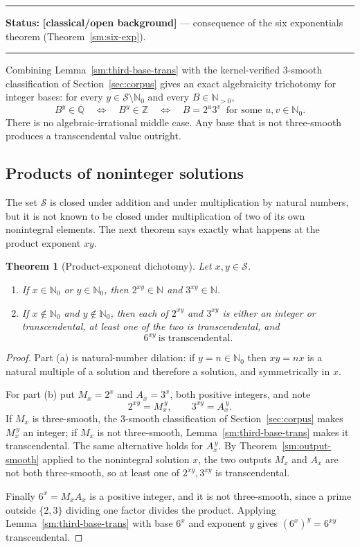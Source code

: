 \documentclass[11pt,oneside]{article}
\newtheorem{theorem}{Theorem}[section]
\theoremstyle{definition}
\theoremstyle{remark}
\newcommand{\N}{\mathbb N}
\newcommand{\Nzero}{\mathbb N_0}
\newcommand{\Z}{\mathbb Z}
\newcommand{\Abar}{\overline{\mathbb Q}}
\newcommand{\Sol}{\mathcal S}
\newcommand{\statusknown}{\textcolor{classicalgray}{\textbf{[classical/open background]}}}
\newenvironment{statusbox}[1]
{\begin{center}\begin{minipage}{0.94\textwidth}\raggedright\hbadness=10000\hrule
\vspace{0.45em}\textbf{Status:} #1\par\vspace{0.35em}}
{\vspace{0.35em}\hrule\end{minipage}\end{center}}
\begin{document}
\begin{statusbox}{\statusknown{} --- consequence of the six exponentials theorem
(Theorem~\ref{sm:six-exp}).}
\end{statusbox}

Combining Lemma~\ref{sm:third-base-trans} with the kernel-verified $3$-smooth classification
of Section~\ref{sec:corpus} gives an exact algebraicity trichotomy for integer bases: for
every $y\in\Sol\setminus\Nzero$ and every $B\in\N_{>0}$,
\begin{equation}
 B^y\in\Abar
 \quad\Longleftrightarrow\quad
 B^y\in\Z
 \quad\Longleftrightarrow\quad
 B=2^u3^v\ \text{ for some }u,v\in\Nzero .
 \label{sm:eq-trichotomy}
\end{equation}
There is no algebraic-irrational middle case.  Any base that is not three-smooth produces a
transcendental value outright.

\subsection{Products of noninteger solutions}

The set $\Sol$ is closed under addition and under multiplication by natural numbers, but it
is not known to be closed under multiplication of two of its own nonintegral elements.  The
next theorem says exactly what happens at the product exponent $xy$.

\begin{theorem}[Product-exponent dichotomy]
\label{sm:product-trans}
Let $x,y\in\Sol$.
\begin{enumerate}[label=\textup{(\alph*)}]
\item If $x\in\Nzero$ or $y\in\Nzero$, then $2^{xy}\in\N$ and $3^{xy}\in\N$.
\item If $x\notin\Nzero$ and $y\notin\Nzero$, then each of $2^{xy}$ and $3^{xy}$ is either an
integer or transcendental, at least one of the two is transcendental, and
\[
 6^{xy}\ \text{is transcendental}.
\]
\end{enumerate}
\end{theorem}

\begin{proof}
Part (a) is natural-number dilation: if $y=n\in\Nzero$ then $xy=nx$ is a natural multiple of
a solution and therefore a solution, and symmetrically in $x$.

For part (b) put $M_x=2^x$ and $A_x=3^x$, both positive integers, and note
\[
 2^{xy}=M_x^{\,y},\qquad 3^{xy}=A_x^{\,y}.
\]
If $M_x$ is three-smooth, the $3$-smooth classification of Section~\ref{sec:corpus} makes
$M_x^{\,y}$ an integer; if $M_x$ is not three-smooth, Lemma~\ref{sm:third-base-trans} makes
it transcendental.  The same alternative holds for $A_x^{\,y}$.  By
Theorem~\ref{sm:output-smooth} applied to the nonintegral solution $x$, the two outputs
$M_x$ and $A_x$ are not both three-smooth, so at least one of $2^{xy},3^{xy}$ is
transcendental.

Finally $6^x=M_xA_x$ is a positive integer, and it is not three-smooth, since a prime outside
$\{2,3\}$ dividing one factor divides the product.  Applying
Lemma~\ref{sm:third-base-trans} with base $6^x$ and exponent $y$ gives
$(6^x)^y=6^{xy}$ transcendental.
\end{proof}
\end{document}
